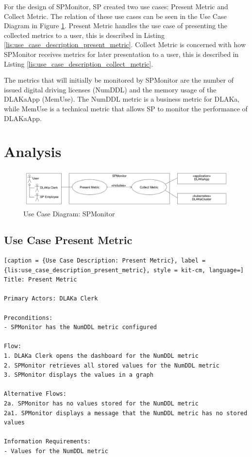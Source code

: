 For the design of SPMonitor, SP created two use cases: Present Metric and Collect Metric.
The relation of these use cases can be seen in the Use Case Diagram in Figure \ref{fig:use_case_monitoring_dlakaapp}.
Present Metric handles the use case of presenting the collected metrics to a user, this is described in Listing \ref{lis:use_case_description_present_metric}.
Collect Metric is concerned with how SPMonitor receives metrics for later presentation to a user, this is described in Listing \ref{lis:use_case_description_collect_metric}.

The metrics that will initially be monitored by SPMonitor are the number of issued digital driving licenses (NumDDL)
and the memory usage of the DLAKaApp (MemUse). The NumDDL metric is a business metric for DLAKa, while MemUse is
a technical metric that allows SP to monitor the performance of DLAKaApp.

\section{Analysis}


\begin{figure}
	\centering
	\includegraphics[width=\textwidth]{figures/2.1_use_case_spmonitor.png}
	\caption{Use Case Diagram: SPMonitor}
	\label{fig:use_case_monitoring_dlakaapp}
\end{figure}

\subsection{Use Case Present Metric}

\begin{lstlisting}[caption = {Use Case Description: Present Metric}, label = {lis:use_case_description_present_metric}, style = kit-cm, language=]
Title: Present Metric

Primary Actors: DLAKa Clerk

Preconditions:
- SPMonitor has the NumDDL metric configured

Flow:
1. DLAKa Clerk opens the dashboard for the NumDDL metric
2. SPMonitor retrieves all stored values for the NumDDL metric
3. SPMonitor displays the values in a graph

Alternative Flows:
2a. SPMonitor has no values stored for the NumDDL metric
2a1. SPMonitor displays a message that the NumDDL metric has no stored values

Information Requirements:
- Values for the NumDDL metric
\end{lstlisting}

